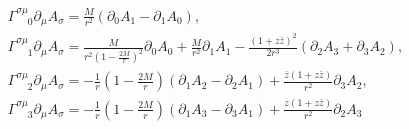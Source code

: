 \documentclass[12pt]{article}
\def\nn{\nonumber}
\begin{document}
\begin{gather}
\Gamma^{\sigma \mu}_{\,\,\,\,\,\,\, 0}
\partial_{\mu}
A_{\sigma}
=
\frac{M}{r^{2}}
\left(
\partial_{0}A_{1}
-
\partial_{1}A_{0}
\right)
,
\nn \\
\Gamma^{\sigma \mu}_{\,\,\,\,\,\,\, 1}
\partial_{\mu}
A_{\sigma}
=
\frac{M}{r^{2} (1 - \frac{2 M}{r})^{2}} 
\partial_{0}
A_{0}
+
\frac{M}{r^{2}}
\partial_{1}
A_{1}
-
\frac{(1 + z \bar{z})^{2}}{2 r^{3}}
(
\partial_{2}
A_{3}
+
\partial_{3}
A_{2})
,
\nn \\
\Gamma^{\sigma \mu}_{\,\,\,\,\,\,\, 2}
\partial_{\mu}
A_{\sigma}
=
-
\frac{1}{r}
(1 - \frac{2 M}{r})
(
\partial_{1}
A_{2}
-
\partial_{2}
A_{1}
)
+
\frac{\bar{z} (1 + z \bar{z})}{r^{2}}
\partial_{3}
A_{2}
,
\nn \\
\Gamma^{\sigma \mu}_{\,\,\,\,\,\,\, 3}
\partial_{\mu}
A_{\sigma}
=
-
\frac{1}{r}
(1 - \frac{2 M}{r})
(
\partial_{1}
A_{3}
-
\partial_{3}
A_{1}
)
+
\frac{z (1 + z \bar{z})}{r^{2}}
\partial_{2}
A_{3}
\end{gather}
\end{document}
